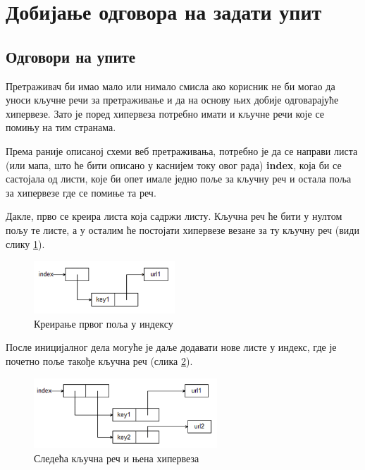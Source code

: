 \section{Добијање одговора на задати упит}
\subsection{Одговори на упите}

Претраживач би имао мало или нимало смисла ако корисник не би могао да уноси кључне речи за претраживање и да на основу њих добије одговарајуће хипервезе. Зато је поред хипервеза потребно имати и кључне речи које се помињу на тим странама.

Према раније описаној схеми веб претраживања, потребно је да се направи листа (или мапа, што ће бити описано у каснијем току овог рада) \textbf{index}, која би се састојала од листи, које би опет имале једно поље за кључну реч и остала поља за хипервезе где се помиње та реч.

Дакле, прво се креира листа која садржи листу. Кључна реч ће бити у нултом пољу те листе, а у осталим ће постојати хипервезе везане за ту кључну реч (види слику \ref{slike:indeks1}).

\begin{figure}[here]
\centering
\includegraphics[height=75px, width=200px]{index1.png}
\caption{Креирање првог поља у индексу}
\label{slike:indeks1}
\end{figure}

После иницијалног дела могуће је даље додавати нове листе у индекс, где је почетно поље такође кључна реч (слика \ref{slike:index2}).\\

\begin{figure}[here]
\centering
\includegraphics[height=100px, width=260px]{index2.png}
\caption{Следећа кључна реч и њена хипервеза}
\label{slike:index2}
\end{figure}

